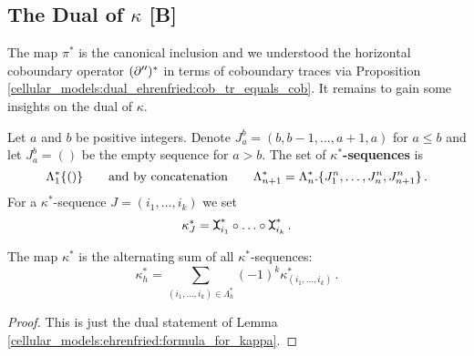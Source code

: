 \subsection{The Dual of \texorpdfstring{$\kappa$}{kappa} [B]}
\label{cellular_models:dual_ehrenfried:kappa_dual}
The map $\pi^\ast$ is the canonical inclusion and we understood the horizontal coboundary operator $(\partial'')^\ast$ in terms of coboundary traces via Proposition \ref{cellular_models:dual_ehrenfried:cob_tr_equals_cob}.
It remains to gain some insights on the dual of $\kappa$.

\begin{defi}
    \label{cellular_models:dual_ehrenfried:kappa_dual_sequences}
    Let $a$ and $b$ be positive integers.
    Denote $J_a^b = (b,b-1, \ldots, a+1, a)$ for $a \le b$ and let $J_a^b = ()$ be the empty sequence for $a > b$.
    The set of {\bf $\kappa^\ast$-sequences} is
    \[
        \Lambda^\ast_1 \{ () \} \mspc{and by concatenation}{20} \Lambda^\ast_{n+1} = \Lambda^\ast_n.\{ J_1^n, \ldots, J_n^n, J_{n+1}^n \} \,.
    \]
    For a $\kappa^\ast$-sequence $J = (i_1, \ldots, i_k)$ we set
    \[
        \kappa^\ast_J = \mueta^\ast_{i_1} \circ \ldots \circ \mueta^\ast_{i_k} \,.
    \]
\end{defi}

\begin{lem}
    \label{cellular_models:dual_ehrenfried:formula_for_kappa_dual}
    The map $\kappa^\ast$ is the alternating sum of all $\kappa^\ast$-sequences:
    \[
        \kappa^\ast_h = \sum_{(i_1, \ldots, i_k) \in \Lambda^\ast_h} (-1)^k \kappa^\ast_{(i_1, \ldots, i_k)} \,.
    \]
\end{lem}

\begin{proof}
    This is just the dual statement of Lemma \ref{cellular_models:ehrenfried:formula_for_kappa}.
\end{proof}

